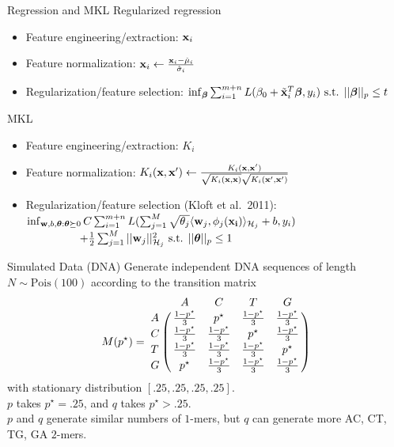 \documentclass{beamer}
\begin{document}
\begin{frame}{Regression and MKL}
  Regularized regression \pause
  \begin{itemize}
    \item Feature engineering/extraction: ${\bf x}_i$ \pause
    \item Feature normalization: ${\bf x}_i \leftarrow \frac{{\bf x}_i - \hat{\mu}_i}{\hat{\sigma}_i}$ \pause
    \item Regularization/feature selection: $\inf_{{\boldsymbol \beta}} \sum_{i=1}^{m+n} L(\beta_0 + \tilde{{\bf x}}_i^T {\boldsymbol \beta}, y_i) \text{ s.t. } || {\boldsymbol \beta} ||_p \leq t$ \pause
  \end{itemize}
  MKL \pause
  \begin{itemize}
    \item Feature engineering/extraction: $K_i$ \pause
    \item Feature normalization: $K_i({\bf x}, {\bf x}') \leftarrow \frac{K_i({\bf x}, {\bf x}')}{\sqrt{K_i({\bf x}, {\bf x})}\sqrt{K_i({\bf x}', {\bf x}')}}$ \pause
    \item Regularization/feature selection (Kloft et al.\ 2011): $\inf_{{\bf w}, b, {\boldsymbol \theta} : {\boldsymbol \theta} \succeq 0}
      C \sum_{i=1}^{m+n} L( \sum_{j=1}^M \sqrt{\theta_j} \langle {\bf w}_j, \phi_j({\bf x_i}) \rangle_{\mathcal{H}_j} + b, y_i) $ \\
      $\qquad \qquad \; \; \; + \frac{1}{2} \sum_{j=1}^M || {\bf w}_j ||^2_{\mathcal{H}_j}
      \text{ s.t. } || {\boldsymbol \theta} ||_p \leq 1$
  \end{itemize}
\end{frame}

\begin{frame}{Simulated Data (DNA)}
  Generate independent DNA sequences of length $N \sim \text{Pois}(100)$ according to the transition matrix
  \begin{equation*}
    M(p^{\star}) = \bordermatrix{
      ~ & A & C & T & G \cr
      A & \frac{1-p^{\star}}{3} & p^{\star} & \frac{1-p^{\star}}{3} & \frac{1-p^{\star}}{3} \cr
      C & \frac{1-p^{\star}}{3} & \frac{1-p^{\star}}{3} & p^{\star} & \frac{1-p^{\star}}{3} \cr
      T & \frac{1-p^{\star}}{3} & \frac{1-p^{\star}}{3} & \frac{1-p^{\star}}{3} & p^{\star} \cr
      G & p^{\star} & \frac{1-p^{\star}}{3} & \frac{1-p^{\star}}{3} & \frac{1-p^{\star}}{3} \cr
    }
  \end{equation*}
  with stationary distribution $[.25, .25, .25, .25]$. \\ \pause
  $p$ takes $p^{\star} = .25$, and $q$ takes $p^{\star} > .25$. \\ \pause
  $p$ and $q$ generate similar numbers of $1$-mers, but $q$ can generate more AC, CT, TG, GA $2$-mers.
\end{frame}
\end{document}
